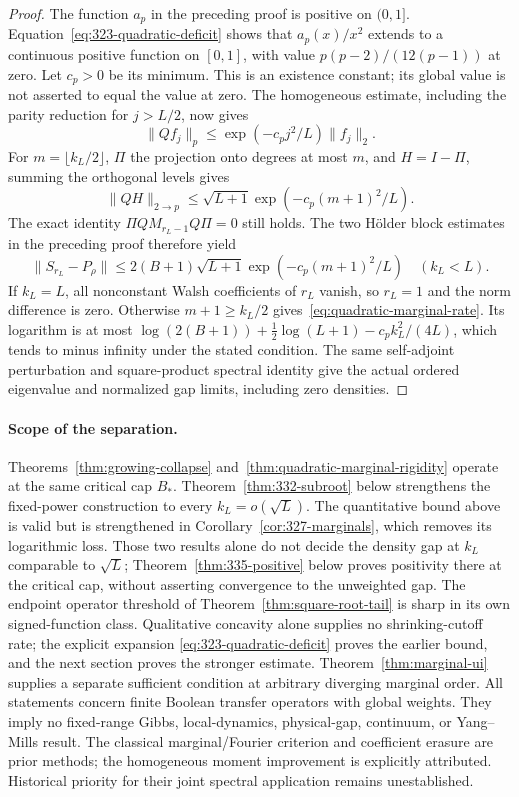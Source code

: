 \documentclass[11pt]{article}
\begin{document}
\begin{proof}
The function $a_p$ in the preceding proof is positive on $(0,1]$.
Equation~\eqref{eq:323-quadratic-deficit} shows that $a_p(x)/x^2$ extends
to a continuous positive function on $[0,1]$, with value
$p(p-2)/(12(p-1))$ at zero. Let $c_p>0$ be its minimum. This is an
existence constant; its global value is not asserted to equal the value
at zero. The homogeneous estimate, including the parity reduction for
$j>L/2$, now gives
\[
 \|Qf_j\|_p\leq \exp(-c_p j^2/L)\|f_j\|_2.
\]
For $m=\lfloor k_L/2\rfloor$, $\Pi$ the projection onto degrees at most
$m$, and $H=I-\Pi$, summing the orthogonal levels gives
\[
 \|QH\|_{2\to p}\leq
 \sqrt{L+1}\exp(-c_p(m+1)^2/L).
\]
The exact identity $\Pi QM_{r_L-1}Q\Pi=0$ still holds. The two
H\"older block estimates in the preceding proof therefore yield
\[
 \|S_{r_L}-P_\rho\|\leq
 2(B+1)\sqrt{L+1}\exp(-c_p(m+1)^2/L)
 \quad(k_L<L).
\]
If $k_L=L$, all nonconstant Walsh coefficients of $r_L$ vanish, so
$r_L=1$ and the norm difference is zero. Otherwise $m+1\geq k_L/2$
gives~\eqref{eq:quadratic-marginal-rate}. Its logarithm is at most
$\log(2(B+1))+\frac12\log(L+1)-c_pk_L^2/(4L)$, which tends to
minus infinity under the stated condition. The same self-adjoint
perturbation and square-product spectral identity give the actual
ordered eigenvalue and normalized gap limits, including zero densities.
\end{proof}

\paragraph{Scope of the separation.}
Theorems~\ref{thm:growing-collapse} and~\ref{thm:quadratic-marginal-rigidity}
operate at the same critical cap $B_*$. Theorem~\ref{thm:332-subroot} below strengthens the fixed-power
construction to every $k_L=o(\sqrt L)$. The quantitative bound above is valid but is
strengthened in Corollary~\ref{cor:327-marginals}, which removes its
logarithmic loss. Those two results alone do not decide the density gap at
$k_L$ comparable to $\sqrt L$; Theorem~\ref{thm:335-positive} below proves
positivity there at the critical cap, without asserting convergence to
the unweighted gap. The endpoint operator threshold of
Theorem~\ref{thm:square-root-tail} is sharp in its own signed-function
class. Qualitative concavity alone supplies no shrinking-cutoff rate;
the explicit expansion \eqref{eq:323-quadratic-deficit} proves the
earlier bound, and the next section proves the stronger estimate.
Theorem~\ref{thm:marginal-ui} supplies a separate sufficient condition at
arbitrary diverging marginal order. All statements concern finite Boolean
transfer operators with global weights. They imply no fixed-range Gibbs,
local-dynamics, physical-gap, continuum, or Yang--Mills result.
The classical marginal/Fourier criterion and coefficient erasure are prior
methods; the homogeneous moment improvement is explicitly attributed.
Historical priority for their joint spectral application remains unestablished.
\end{document}
